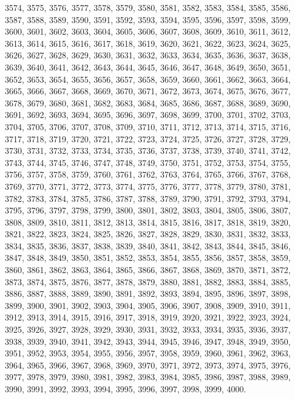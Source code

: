 \documentclass[a4paper,11pt]{article}
\begin{document}
3574, 3575, 3576, 3577, 3578, 3579, 3580, 3581, 3582, 3583, 3584,
3585, 3586, 3587, 3588, 3589, 3590, 3591, 3592, 3593, 3594, 3595,
3596, 3597, 3598, 3599, 3600, 3601, 3602, 3603, 3604, 3605, 3606,
3607, 3608, 3609, 3610, 3611, 3612, 3613, 3614, 3615, 3616, 3617,
3618, 3619, 3620, 3621, 3622, 3623, 3624, 3625, 3626, 3627, 3628,
3629, 3630, 3631, 3632, 3633, 3634, 3635, 3636, 3637, 3638, 3639,
3640, 3641, 3642, 3643, 3644, 3645, 3646, 3647, 3648, 3649, 3650,
3651, 3652, 3653, 3654, 3655, 3656, 3657, 3658, 3659, 3660, 3661,
3662, 3663, 3664, 3665, 3666, 3667, 3668, 3669, 3670, 3671, 3672,
3673, 3674, 3675, 3676, 3677, 3678, 3679, 3680, 3681, 3682, 3683,
3684, 3685, 3686, 3687, 3688, 3689, 3690, 3691, 3692, 3693, 3694,
3695, 3696, 3697, 3698, 3699, 3700, 3701, 3702, 3703, 3704, 3705,
3706, 3707, 3708, 3709, 3710, 3711, 3712, 3713, 3714, 3715, 3716,
3717, 3718, 3719, 3720, 3721, 3722, 3723, 3724, 3725, 3726, 3727,
3728, 3729, 3730, 3731, 3732, 3733, 3734, 3735, 3736, 3737, 3738,
3739, 3740, 3741, 3742, 3743, 3744, 3745, 3746, 3747, 3748, 3749,
3750, 3751, 3752, 3753, 3754, 3755, 3756, 3757, 3758, 3759, 3760,
3761, 3762, 3763, 3764, 3765, 3766, 3767, 3768, 3769, 3770, 3771,
3772, 3773, 3774, 3775, 3776, 3777, 3778, 3779, 3780, 3781, 3782,
3783, 3784, 3785, 3786, 3787, 3788, 3789, 3790, 3791, 3792, 3793,
3794, 3795, 3796, 3797, 3798, 3799, 3800, 3801, 3802, 3803, 3804,
3805, 3806, 3807, 3808, 3809, 3810, 3811, 3812, 3813, 3814, 3815,
3816, 3817, 3818, 3819, 3820, 3821, 3822, 3823, 3824, 3825, 3826,
3827, 3828, 3829, 3830, 3831, 3832, 3833, 3834, 3835, 3836, 3837,
3838, 3839, 3840, 3841, 3842, 3843, 3844, 3845, 3846, 3847, 3848,
3849, 3850, 3851, 3852, 3853, 3854, 3855, 3856, 3857, 3858, 3859,
3860, 3861, 3862, 3863, 3864, 3865, 3866, 3867, 3868, 3869, 3870,
3871, 3872, 3873, 3874, 3875, 3876, 3877, 3878, 3879, 3880, 3881,
3882, 3883, 3884, 3885, 3886, 3887, 3888, 3889, 3890, 3891, 3892,
3893, 3894, 3895, 3896, 3897, 3898, 3899, 3900, 3901, 3902, 3903,
3904, 3905, 3906, 3907, 3908, 3909, 3910, 3911, 3912, 3913, 3914,
3915, 3916, 3917, 3918, 3919, 3920, 3921, 3922, 3923, 3924, 3925,
3926, 3927, 3928, 3929, 3930, 3931, 3932, 3933, 3934, 3935, 3936,
3937, 3938, 3939, 3940, 3941, 3942, 3943, 3944, 3945, 3946, 3947,
3948, 3949, 3950, 3951, 3952, 3953, 3954, 3955, 3956, 3957, 3958,
3959, 3960, 3961, 3962, 3963, 3964, 3965, 3966, 3967, 3968, 3969,
3970, 3971, 3972, 3973, 3974, 3975, 3976, 3977, 3978, 3979, 3980,
3981, 3982, 3983, 3984, 3985, 3986, 3987, 3988, 3989, 3990, 3991,
3992, 3993, 3994, 3995, 3996, 3997, 3998, 3999, 4000.
\end{document}
